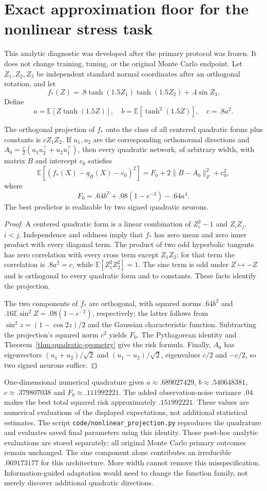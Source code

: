 \section{Exact approximation floor for the nonlinear stress task}
\label{app:nonlinear}
This analytic diagnostic was developed after the primary protocol was
frozen. It does not change training, tuning, or the original Monte Carlo
endpoint. Let $Z_1,Z_2,Z_3$ be independent standard normal coordinates after
an orthogonal rotation, and let
\[
 f_*(Z)=.8\tanh(1.5Z_1)\tanh(1.5Z_2)+.4\sin Z_3.
\]
Define
\[
 a=\mathbb E[Z\tanh(1.5Z)],\quad
 b=\mathbb E[\tanh^2(1.5Z)],\quad c=.8a^2.
\]
\begin{proposition}
The orthogonal projection of $f_*$ onto the class of all centered quadratic
forms plus constants is $cZ_1Z_2$. If $u_1,u_2$ are the corresponding
orthonormal directions and
$A_0=\frac c2(u_1u_2^\top+u_2u_1^\top)$, then every quadratic network,
of arbitrary width, with matrix $B$ and intercept $c_0$ satisfies
\[
 \mathbb E[(f_*(X)-q_B(X)-c_0)^2]
 =F_0+2\|B-A_0\|_F^2+c_0^2,
\]
where
\[
 F_0=.64b^2+.08(1-e^{-2})-.64a^4.
\]
The best predictor is realizable by two signed quadratic neurons.
\end{proposition}
\begin{proof}
A centered quadratic form is a linear combination of $Z_i^2-1$ and
$Z_iZ_j$, $i<j$. Independence and oddness imply that $f_*$ has zero
mean and zero inner product with every diagonal term. The product of two
odd hyperbolic tangents has zero correlation with every cross term except
$Z_1Z_2$; for that term the correlation is $.8a^2=c$, while
$\mathbb E[Z_1^2Z_2^2]=1$. The sine term is odd under $Z\mapsto-Z$ and
is orthogonal to every quadratic form and to constants. These facts identify
the projection.

The two components of $f_*$ are orthogonal, with squared norms $.64b^2$
and $.16\mathbb E\sin^2 Z=.08(1-e^{-2})$, respectively; the latter follows
from $\sin^2 z=(1-\cos2z)/2$ and the Gaussian characteristic function.
Subtracting the projection's squared norm $c^2$ yields $F_0$. The
Pythagorean identity and Theorem~\ref{thm:quadratic-geometry} give the risk
formula. Finally, $A_0$ has eigenvectors $(u_1+u_2)/\sqrt2$ and
$(u_1-u_2)/\sqrt2$, eigenvalues $c/2$ and $-c/2$, so two signed neurons
suffice.
\end{proof}
One-dimensional numerical quadrature gives
$a\approx.689027429$, $b\approx.540648381$, $c\approx.379807038$ and
$F_0\approx.111992221$. The added observation-noise variance $.04$ makes
the best total squared risk approximately $.151992221$. These values are
numerical evaluations of the displayed expectations, not additional
statistical estimates. The script \texttt{code/nonlinear\_projection.py}
reproduces the quadrature and evaluates saved final parameters using this
identity. Those post-hoc analytic evaluations are stored separately; all
original Monte Carlo primary outcomes remain unchanged. The sine component alone contributes an irreducible
$.069173177$ for this architecture. More width cannot remove this
misspecification. Information-guided adaptation would need to change the
function family, not merely discover additional quadratic directions.
